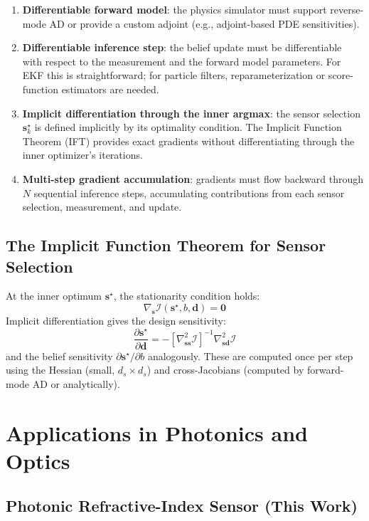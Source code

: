 \documentclass[11pt,a4paper]{article}
\begin{document}
\begin{enumerate}[nosep]
  \item \textbf{Differentiable forward model}: the physics simulator must support reverse-mode AD or provide a custom adjoint (e.g., adjoint-based PDE sensitivities).
  \item \textbf{Differentiable inference step}: the belief update must be differentiable with respect to the measurement and the forward model parameters.  For EKF this is straightforward; for particle filters, reparameterization or score-function estimators are needed.
  \item \textbf{Implicit differentiation through the inner argmax}: the sensor selection $\bm{s}_k^\star$ is defined implicitly by its optimality condition.  The Implicit Function Theorem (IFT) provides exact gradients without differentiating through the inner optimizer's iterations.
  \item \textbf{Multi-step gradient accumulation}: gradients must flow backward through $N$ sequential inference steps, accumulating contributions from each sensor selection, measurement, and update.
\end{enumerate}

\subsection{The Implicit Function Theorem for Sensor Selection}

At the inner optimum $\bm{s}^\star$, the stationarity condition holds:
\[
  \nabla_{\bm{s}} \mathcal{I}(\bm{s}^\star, b, \bm{d}) = \bm{0}
\]
Implicit differentiation gives the design sensitivity:
\[
  \frac{\partial \bm{s}^\star}{\partial \bm{d}} = -\left[\nabla^2_{\bm{ss}} \mathcal{I}\right]^{-1} \nabla^2_{\bm{sd}} \mathcal{I}
\]
and the belief sensitivity $\partial \bm{s}^\star / \partial b$ analogously.  These are computed once per step using the Hessian (small, $d_s \times d_s$) and cross-Jacobians (computed by forward-mode AD or analytically).

\section{Applications in Photonics and Optics}

\subsection{Photonic Refractive-Index Sensor (This Work)}
\end{document}
